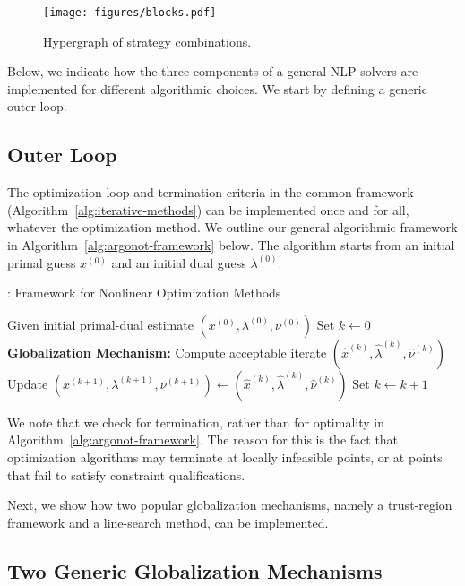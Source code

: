 \begin{figure}[h!]
\centering
\texttt{[image: figures/blocks.pdf]}
\caption{Hypergraph of strategy combinations.}
\label{fig:StrategyGraph}
\end{figure}

Below, we indicate how the three components of a general NLP solvers are implemented for
different algorithmic choices. We start by defining a generic outer loop.


\subsection{Outer Loop}
The optimization loop and termination criteria in the common framework (Algorithm~\ref{alg:iterative-methods}) can be
implemented once and for all, whatever the optimization method. We outline our general algorithmic framework in
Algorithm~\ref{alg:argonot-framework} below. The algorithm starts from an initial primal guess $x^{(0)}$ and an
initial dual guess $\lambda^{(0)}$. 

\medskip
\begin{algorithm}[H]
\label{alg:argonot-framework}
\caption{\solvername{}: Framework for Nonlinear Optimization Methods}
Given initial primal-dual estimate $(x^{(0)}, \lambda^{(0)}, \nu^{(0)})$ \;
Set $k \gets 0$ \;
 {
	\globalizationmechanism \textbf{Globalization Mechanism:} \;
	\globalizationmechanism Compute acceptable iterate $(\hat{x}^{(k)}, \hat{\lambda}^{(k)}, \hat{\nu}^{(k)})$ \;
	Update $(x^{(k+1)}, \lambda^{(k+1)}, \nu^{(k+1)}) \gets (\hat{x}^{(k)}, \hat{\lambda}^{(k)}, \hat{\nu}^{(k)})$ \;
	Set $k \gets k+1$ \;
}
\end{algorithm}
\medskip

We note that we check for termination, rather than for optimality in Algorithm~\ref{alg:argonot-framework}. The reason
for this is the fact that optimization algorithms may terminate at locally infeasible points, or at points that fail to
satisfy constraint qualifications.

Next, we show how two popular globalization mechanisms, namely a trust-region framework and a line-search method,
can be implemented.

\subsection{Two Generic Globalization Mechanisms}

